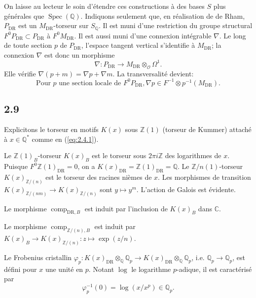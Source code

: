 \documentclass[12pt,a4paper]{article}
\theoremstyle{plain}
\theoremstyle{definition}
\theoremstyle{remark}
\DeclareMathOperator{\Spec}{Spec}
\providecommand{\Spec}{\operatorname{Spec}}
\providecommand{\DR}{\mathrm{DR}}
\providecommand{\comp}{\operatorname{comp}}
\begin{document}
On laisse au lecteur le soin d'\'etendre ces constructions \`a des bases $S$ plus
g\'en\'erales que $\Spec(\mathbb{Q})$. Indiquons seulement que, en r\'ealisation de de Rham,
$P_{\DR}$ est un $M_{\DR}$-torseur sur $S_\mathbb{Q}$. Il est muni d'une restriction du
groupe structural $F^0 P_{\DR} \subset P_{\DR}$ \`a $F^0 M_{\DR}$. Il est aussi muni d'une
connexion int\'egrable $\nabla$. Le long de toute section $p$ de $P_{\DR}$, l'espace
tangent vertical s'identifie \`a $M_{\DR}$; la connexion $\nabla$ est donc un morphisme
\[
\nabla: P_{\DR} \longrightarrow M_{\DR} \otimes_{\mathcal{O}} \Omega^1.
\]
Elle v\'erifie $\nabla(p + m) = \nabla p + \nabla m$. La transversalit\'e devient:
\begin{equation}\label{eq:2.8.1}
\text{Pour } p \text{ une section locale de } F^0 P_{\DR}, \nabla p \in F^{-1}
\otimes p^{-1}(M_{\DR}).
\end{equation}

\subsection*{2.9}

Explicitons le torseur en motifs $K(x)$ sous $\mathbb{Z}(1)$ (torseur de Kummer)
attach\'e \`a $x \in \mathbb{Q}^*$ comme en (\ref{eq:2.4.1}).

Le $\mathbb{Z}(1)_B$-torseur $K(x)_B$ est le torseur sous $2\pi i \mathbb{Z}$ des
logarithmes de $x$. Puisque $F^0 \mathbb{Z}(1)_{\DR} = 0$, on a $K(x)_{\DR} =
\mathbb{Z}(1)_{\DR} = \mathbb{Q}$. Le $\mathbb{Z}/n(1)$-torseur
$K(x)_{\mathbb{Z}/(n)}$ est le torseur des racines ni\`emes de $x$. Les morphismes de
transition $K(x)_{\mathbb{Z}/(nm)} \to K(x)_{\mathbb{Z}/(n)}$ sont $y \mapsto y^m$.
L'action de Galois est \'evidente.

Le morphisme $\comp_{\DR,B}$ est induit par l'inclusion de $K(x)_B$ dans $\mathbb{C}$.

Le morphisme $\comp_{\mathbb{Z}/(n),B}$ est induit par $K(x)_B \to
K(x)_{\mathbb{Z}/(n)}: z \mapsto \exp(z/n)$.

Le Frobenius cristallin $\varphi_p: K(x)_{\DR} \otimes_{\mathbb{Q}} \mathbb{Q}_p \to
K(x)_{\DR} \otimes_{\mathbb{Q}} \mathbb{Q}_p$, i.e. $\mathbb{Q}_p \to \mathbb{Q}_p$, est
d\'efini pour $x$ une unit\'e en $p$. Notant $\log$ le logarithme $p$-adique, il est
caract\'eris\'e par
\begin{equation}\label{eq:2.9}
\varphi_p^{-1}(0) = \log(x/x^p) \in \mathbb{Q}_p.
\end{equation}
\end{document}
